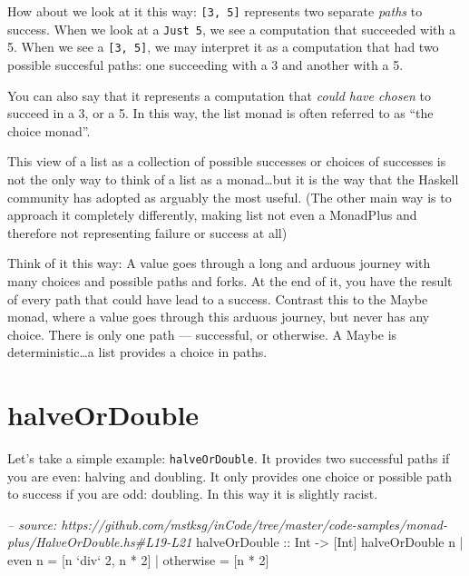 \documentclass[]{article}
\newenvironment{Shaded}{\begin{snugshade}}{\end{snugshade}}
\newcommand{\CommentTok}[1]{\textcolor[rgb]{0.56,0.35,0.01}{\textit{#1}}}
\newcommand{\DataTypeTok}[1]{\textcolor[rgb]{0.13,0.29,0.53}{#1}}
\newcommand{\DecValTok}[1]{\textcolor[rgb]{0.00,0.00,0.81}{#1}}
\newcommand{\FunctionTok}[1]{\textcolor[rgb]{0.00,0.00,0.00}{#1}}
\newcommand{\NormalTok}[1]{#1}
\newcommand{\OtherTok}[1]{\textcolor[rgb]{0.56,0.35,0.01}{#1}}
\begin{document}
How about we look at it this way: \texttt{{[}3,\ 5{]}} represents two separate
\emph{paths} to success. When we look at a \texttt{Just\ 5}, we see a
computation that succeeded with a 5. When we see a \texttt{{[}3,\ 5{]}}, we may
interpret it as a computation that had two possible succesful paths: one
succeeding with a 3 and another with a 5.

You can also say that it represents a computation that \emph{could have chosen}
to succeed in a 3, or a 5. In this way, the list monad is often referred to as
``the choice monad''.

This view of a list as a collection of possible successes or choices of
successes is not the only way to think of a list as a monad\ldots{}but it is the
way that the Haskell community has adopted as arguably the most useful. (The
other main way is to approach it completely differently, making list not even a
MonadPlus and therefore not representing failure or success at all)

Think of it this way: A value goes through a long and arduous journey with many
choices and possible paths and forks. At the end of it, you have the result of
every path that could have lead to a success. Contrast this to the Maybe monad,
where a value goes through this arduous journey, but never has any choice. There
is only one path --- successful, or otherwise. A Maybe is deterministic\ldots{}a
list provides a choice in paths.

\hypertarget{halveordouble}{%
\section{halveOrDouble}\label{halveordouble}}

Let's take a simple example: \texttt{halveOrDouble}. It provides two successful
paths if you are even: halving and doubling. It only provides one choice or
possible path to success if you are odd: doubling. In this way it is slightly
racist.

\begin{Shaded}
\begin{Highlighting}[]
\CommentTok{-- source: https://github.com/mstksg/inCode/tree/master/code-samples/monad-plus/HalveOrDouble.hs#L19-L21}
\OtherTok{halveOrDouble ::} \DataTypeTok{Int} \OtherTok{->}\NormalTok{ [}\DataTypeTok{Int}\NormalTok{]}
\NormalTok{halveOrDouble n }\FunctionTok{|}\NormalTok{ even n    }\FunctionTok{=}\NormalTok{ [n }\OtherTok{`div`} \DecValTok{2}\NormalTok{, n }\FunctionTok{*} \DecValTok{2}\NormalTok{]}
                \FunctionTok{|}\NormalTok{ otherwise }\FunctionTok{=}\NormalTok{ [n }\FunctionTok{*} \DecValTok{2}\NormalTok{]}
\end{Highlighting}
\end{Shaded}
\end{document}
